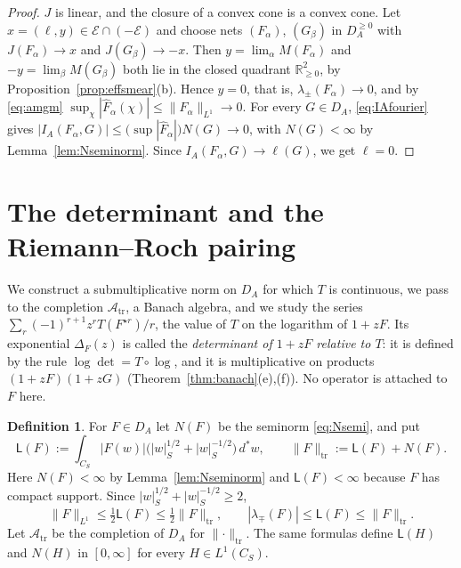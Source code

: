 \documentclass[11pt]{amsart}
\theoremstyle{definition}
\newtheorem{definition}[theorem]{Definition}
\theoremstyle{remark}
\newcommand{\R}{\mathbb R}
\newcommand{\dstar}{\,d^{*}}
\newcommand{\DA}{D_A}
\begin{document}
\begin{proof}
$J$ is linear, and the closure of a convex cone is a convex cone.  Let
$x=(\ell,y)\in\mathcal E\cap(-\mathcal E)$ and choose nets $(F_{\alpha})$,
$(G_{\beta})$ in $\DA^{\ge0}$ with $J(F_{\alpha})\to x$ and
$J(G_{\beta})\to-x$.  Then $y=\lim_{\alpha}M(F_{\alpha})$ and
$-y=\lim_{\beta}M(G_{\beta})$ both lie in the closed quadrant
$\R_{\ge0}^{2}$, by Proposition~\ref{prop:effsmear}(b).  Hence $y=0$, that is,
$\lambda_{\pm}(F_{\alpha})\to0$, and by \eqref{eq:amgm}
$\sup_{\chi}|\widehat F_{\alpha}(\chi)|\le\lVert F_{\alpha}\rVert_{L^{1}}\to0$.
For every $G\in\DA$, \eqref{eq:IAfourier} gives
$|I_A(F_{\alpha},G)|\le\bigl(\sup|\widehat F_{\alpha}|\bigr)N(G)\to0$, with
$N(G)<\infty$ by Lemma~\ref{lem:Nseminorm}.  Since
$I_A(F_{\alpha},G)\to\ell(G)$, we get $\ell=0$.
\end{proof}


\section{The determinant and the Riemann--Roch pairing}\label{sec:banach}

We construct a submultiplicative norm on $\DA$ for which $T$ is continuous,
we pass to the completion $\mathcal A_{\mathrm{tr}}$, a Banach algebra,
and we study the series $\sum_r(-1)^{r+1}z^{r}T(F^{\star r})/r$, the value of
$T$ on the logarithm of $1+zF$.  Its exponential $\Delta_F(z)$ is called the
\emph{determinant of $1+zF$ relative to $T$}: it is defined by the rule
$\log\det=T\circ\log$, and it is multiplicative on products
$(1+zF)(1+zG)$ (Theorem~\ref{thm:banach}(e),(f)).  No operator is attached to
$F$ here.

\begin{definition}\label{def:trnorm}
For $F\in\DA$ let $N(F)$ be the seminorm \eqref{eq:Nsemi}, and put
\begin{equation}\label{eq:trnorm}
\mathsf L(F):=\int_{C_S}|F(w)|\bigl(|w|_S^{1/2}+|w|_S^{-1/2}\bigr)\dstar w,
\qquad
\lVert F\rVert_{\mathrm{tr}}:=\mathsf L(F)+N(F).
\end{equation}
Here $N(F)<\infty$ by Lemma~\ref{lem:Nseminorm} and $\mathsf L(F)<\infty$ because
$F$ has compact support.  Since $|w|_S^{1/2}+|w|_S^{-1/2}\ge2$,
\begin{equation}\label{eq:trnormineq}
\lVert F\rVert_{L^{1}}\le\tfrac12\mathsf L(F)\le\tfrac12\lVert
F\rVert_{\mathrm{tr}},\qquad
|\lambda_{\mp}(F)|\le\mathsf L(F)\le\lVert F\rVert_{\mathrm{tr}} .
\end{equation}
Let $\mathcal A_{\mathrm{tr}}$ be the completion of $\DA$ for $\lVert\cdot\rVert_{\mathrm{tr}}$.
The same formulas define $\mathsf L(H)$ and $N(H)$ in $[0,\infty]$ for every
$H\in L^{1}(C_S)$.
\end{definition}
\end{document}
